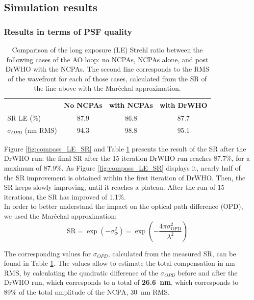 \documentclass[twocolumn]{aa}
\begin{document}
\subsection{Simulation results}
\subsubsection{Results in terms of PSF quality}

\begin{table}[]
\begin{tabular}{l|ccc}
                               & \multicolumn{1}{l}{No NCPAs} & \multicolumn{1}{l}{with NCPAs} & \multicolumn{1}{l}{with DrWHO} \\ \hline
SR LE (\%)                          & 87.9                      & 86.8                         & 87.7                           \\
$\sigma_{OPD}$ (nm RMS) & 94.3                      & 98.8                         & 95.1                         
\end{tabular}
\caption{Comparison of the long exposure (LE) Strehl ratio between the following cases of the AO loop: no NCPAs, NCPAs alone, and post DrWHO with the NCPAs. The second line corresponds to the RMS of the wavefront for each of those cases, calculated from the SR of the line above with the Maréchal approximation.}
\label{tab:compass_comp}
\end{table}


Figure \ref{fig:compass_LE_SR} and Table \ref{tab:compass_comp} presents the result of the SR after the DrWHO run: the final SR after the 15 iteration DrWHO run reaches 87.7\%, for a maximum of 87.9\%. As Figure \ref{fig:compass_LE_SR} displays it, nearly half of the SR improvement is obtained within the first iteration of DrWHO. Then, the SR keeps slowly improving, until it reaches a plateau. After the run of 15 iterations, the SR has improved of 1.1\%. \\

In order to better understand the impact on the optical path difference (OPD), we used the Maréchal approximation:
\begin{equation}
    \text{SR} = \exp(-\sigma_{\Phi}^2) = \exp\left(%
    -\dfrac{4\pi \sigma_{\text{OPD}}^2}{\lambda^2}
    \right)
\end{equation}

The corresponding values for $\sigma_{OPD}$, calculated from the measured SR, can be found in Table \ref{tab:compass_comp}. The values allow to estimate the total compensation in nm RMS, by calculating the quadratic difference of the  $\sigma_{OPD}$ before and after the DrWHO run, which corresponds to a total of \textbf{26.6~nm}, which corresponds to 89\% of the total amplitude of the NCPA, 30~nm RMS.\\
\end{document}
